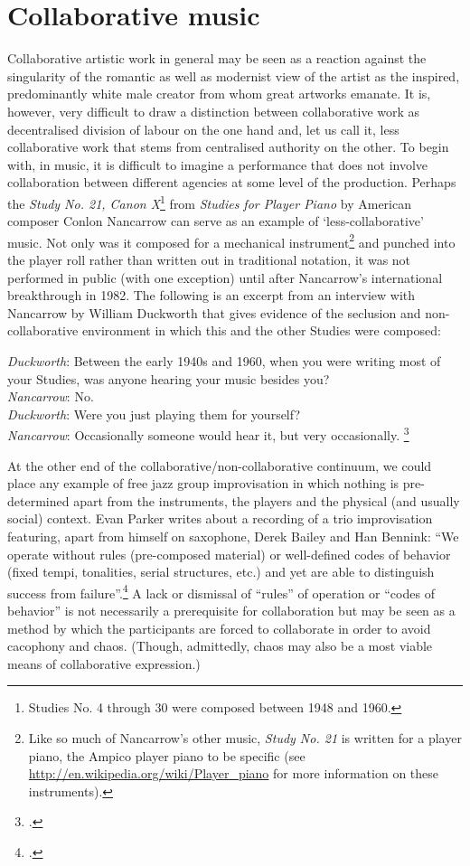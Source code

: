 \section{Collaborative music}
\label{sec:negotiating-5}
Collaborative artistic work in general may be seen as a reaction against the singularity of the romantic as well as modernist view of the artist as the inspired, predominantly white male creator from whom great artworks emanate. It is, however, very difficult to draw a distinction between collaborative work as decentralised division of labour on the one hand and, let us call it, less collaborative work that stems from centralised authority on the other. To begin with, in music, it is difficult to imagine a performance that does not involve collaboration between different agencies at some level of the production. Perhaps the \emph{Study No. 21, Canon X}\footnote{Studies No. 4 through 30 were composed between 1948 and 1960.} from \emph{Studies for Player Piano} by American composer Conlon Nancarrow can serve as an example of `less-collaborative' music. Not only was it composed for a mechanical instrument\footnote{Like so much of Nancarrow's other music, \emph{Study No. 21} is written for a player piano, the Ampico player piano to be specific (see \url{http://en.wikipedia.org/wiki/Player_piano} for more information on these instruments).} and punched into the player roll rather than written out in traditional notation, it was not performed in public (with one exception) until after Nancarrow's international breakthrough in 1982. The following is an excerpt from an interview with Nancarrow by William Duckworth that gives evidence of the seclusion and non-collaborative environment in which this and the other Studies were composed:
\begin{squote}
  \emph{Duckworth}: Between the early 1940s and 1960, when you were writing most of your Studies, was anyone hearing your music besides you?\\
  \emph{Nancarrow}: No.\\
  \emph{Duckworth}: Were you just playing them for yourself?\\
  \emph{Nancarrow}: Occasionally someone would hear it, but very
  occasionally. \footcite[49]{duckworth99}
\end{squote}

\label{sec:5-par:2}
At the other end of the collaborative/non-collaborative continuum, we could place any example of free jazz group improvisation in which nothing is pre-determined apart from the instruments, the players and the physical (and usually social) context. Evan Parker writes about a recording of a trio improvisation featuring, apart from himself on saxophone, Derek Bailey and Han Bennink: ``We operate without rules (pre-composed material) or well-defined codes of behavior (fixed tempi, tonalities, serial structures, etc.) and yet are able to distinguish success from failure''.\footcite[As cited in][39]{lebaron02} A lack or dismissal of ``rules'' of operation or ``codes of behavior'' is not necessarily a prerequisite for collaboration but may be seen as a method by which the participants are forced to collaborate in order to avoid cacophony and chaos. (Though, admittedly, chaos may also be a most viable means of collaborative expression.) 

